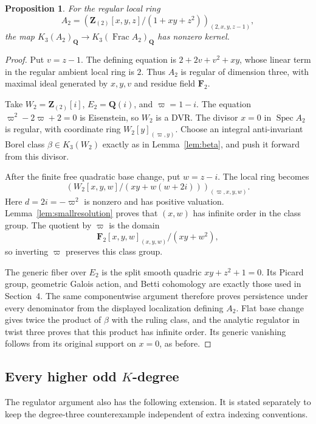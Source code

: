 \documentclass[11pt,a4paper]{article}
\newtheorem{proposition}[theorem]{Proposition}
\theoremstyle{remark}
\newcommand{\Q}{\mathbf Q}
\newcommand{\Z}{\mathbf Z}
\newcommand{\F}{\mathbf F}
\newcommand{\Spec}{\operatorname{Spec}}
\newcommand{\Frac}{\operatorname{Frac}}
\newcommand{\Qrat}{_{\Q}}
\begin{document}
\begin{proposition}\label{prop:two}
For the regular local ring
\[
A_2=\left(\Z_{(2)}[x,y,z]/(1+xy+z^2)\right)_{(2,x,y,z-1)},
\]
the map $K_3(A_2)\Qrat\to K_3(\Frac A_2)\Qrat$ has nonzero kernel.
\end{proposition}
\begin{proof}
Put $v=z-1$. The defining equation is $2+2v+v^2+xy$, whose linear term in the regular ambient local ring is $2$. Thus $A_2$ is regular of dimension three, with maximal ideal generated by $x,y,v$ and residue field $\F_2$.

Take $W_2=\Z_{(2)}[i]$, $E_2=\Q(i)$, and $\varpi=1-i$. The equation $\varpi^2-2\varpi+2=0$ is Eisenstein, so $W_2$ is a DVR. The divisor $x=0$ in $\Spec A_2$ is regular, with coordinate ring $W_2[y]_{(\varpi,y)}$. Choose an integral anti-invariant Borel class $\beta\in K_3(W_2)$ exactly as in Lemma~\ref{lem:beta}, and push it forward from this divisor.

After the finite free quadratic base change, put $w=z-i$. The local ring becomes
\[
\left(W_2[x,y,w]/(xy+w(w+2i))\right)_{(\varpi,x,y,w)}.
\]
Here $d=2i=-\varpi^2$ is nonzero and has positive valuation. Lemma~\ref{lem:smallresolution} proves that $(x,w)$ has infinite order in the class group. The quotient by $\varpi$ is the domain
\[
\F_2[x,y,w]_{(x,y,w)}/(xy+w^2),
\]
so inverting $\varpi$ preserves this class group.

The generic fiber over $E_2$ is the split smooth quadric $xy+z^2+1=0$. Its Picard group, geometric Galois action, and Betti cohomology are exactly those used in Section~4. The same componentwise argument therefore proves persistence under every denominator from the displayed localization defining $A_2$. Flat base change gives twice the product of $\beta$ with the ruling class, and the analytic regulator in twist three proves that this product has infinite order. Its generic vanishing follows from its original support on $x=0$, as before.
\end{proof}

\subsection{Every higher odd $K$-degree}

The regulator argument also has the following extension. It is stated separately to keep the degree-three counterexample independent of extra indexing conventions.
\end{document}
